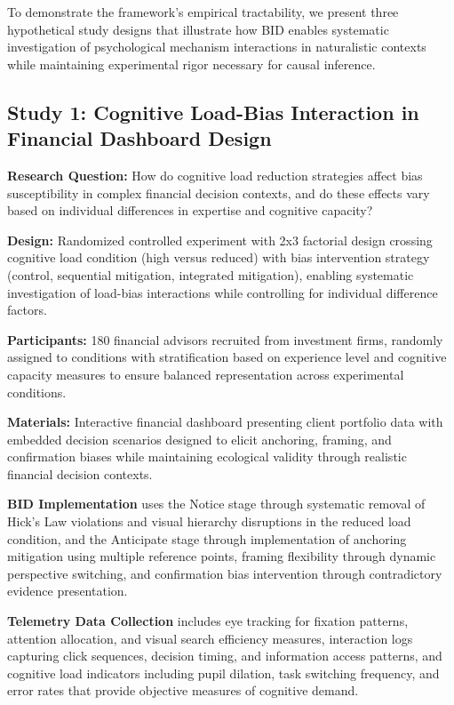 \documentclass[
  authoryear,
  preprint]{elsarticle}
\begin{document}
To demonstrate the framework's empirical tractability, we present three
hypothetical study designs that illustrate how BID enables systematic
investigation of psychological mechanism interactions in naturalistic
contexts while maintaining experimental rigor necessary for causal
inference.

\subsection{Study 1: Cognitive Load-Bias Interaction in Financial
Dashboard
Design}\label{study-1-cognitive-load-bias-interaction-in-financial-dashboard-design}

\textbf{Research Question:} How do cognitive load reduction strategies
affect bias susceptibility in complex financial decision contexts, and
do these effects vary based on individual differences in expertise and
cognitive capacity?

\textbf{Design:} Randomized controlled experiment with 2x3 factorial
design crossing cognitive load condition (high versus reduced) with bias
intervention strategy (control, sequential mitigation, integrated
mitigation), enabling systematic investigation of load-bias interactions
while controlling for individual difference factors.

\textbf{Participants:} 180 financial advisors recruited from investment
firms, randomly assigned to conditions with stratification based on
experience level and cognitive capacity measures to ensure balanced
representation across experimental conditions.

\textbf{Materials:} Interactive financial dashboard presenting client
portfolio data with embedded decision scenarios designed to elicit
anchoring, framing, and confirmation biases while maintaining ecological
validity through realistic financial decision contexts.

\textbf{BID Implementation} uses the Notice stage through systematic
removal of Hick's Law violations and visual hierarchy disruptions in the
reduced load condition, and the Anticipate stage through implementation
of anchoring mitigation using multiple reference points, framing
flexibility through dynamic perspective switching, and confirmation bias
intervention through contradictory evidence presentation.

\textbf{Telemetry Data Collection} includes eye tracking for fixation
patterns, attention allocation, and visual search efficiency measures,
interaction logs capturing click sequences, decision timing, and
information access patterns, and cognitive load indicators including
pupil dilation, task switching frequency, and error rates that provide
objective measures of cognitive demand.
\end{document}
